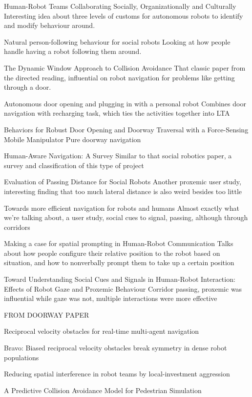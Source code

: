 \documentclass{sfuthesis}
\begin{document}
Human-Robot Teams Collaborating Socially, Organizationally and Culturally	Interesting idea about three levels of customs for autonomous robots to identify and modify behaviour around.	

Natural person-following behaviour for social robots	Looking at how people handle having a robot following them around.	

The Dynamic Window Approach to Collision Avoidance	That classic paper from the directed reading, influential on robot navigation for problems like getting through a door.	

Autonomous door opening and plugging in with a personal robot	Combines door navigation with recharging task, which ties the activities together into LTA

Behaviors for Robust Door Opening and Doorway Traversal with a Force-Sensing Mobile Manipulator		Pure doorway navigation

Human-Aware Navigation: A Survey	Similar to that social robotics paper, a survey and classification of this type of project	

Evaluation of Passing Distance for Social Robots	Another proxemic user study, interesting finding that too much lateral distance is also weird besides too little	

Towards more efficient navigation for robots and humans	Almost exactly what we're talking about, a user study, social cues to signal, passing, although through corridors	

Making a case for spatial prompting in Human-Robot Communication	Talks about how people configure their relative position to the robot based on situation, and how to nonverbally prompt them to take up a certain position	

Toward Understanding Social Cues and Signals in Human-Robot Interaction: Effects of Robot Gaze and Proxemic Behaviour	Corridor passing, proxemic was influential while gaze was not, multiple interactions were more effective	



FROM DOORWAY PAPER

Reciprocal velocity obstacles for real-time multi-agent navigation

Bravo: Biased reciprocal velocity obstacles break symmetry in dense robot populations

Reducing spatial interference in robot teams by local-investment aggression

A Predictive Collision Avoidance Model for Pedestrian Simulation
\end{document}
